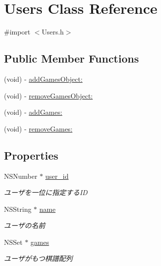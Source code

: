 \hypertarget{interface_users}{
\section{Users Class Reference}
\label{interface_users}
}


{\ttfamily \#import $<$Users.h$>$}

\subsection*{Public Member Functions}
\begin{DoxyCompactItemize}
\item 
(void) -\/ \hyperlink{interface_users_a9e60f26bc975d9867dfb48b44a9d1a27}{addGamesObject:}
\item 
(void) -\/ \hyperlink{interface_users_a7a1b1e37f674755055ce137a77b7ad21}{removeGamesObject:}
\item 
(void) -\/ \hyperlink{interface_users_a447de9f95daae7143c9decf6aa0cd159}{addGames:}
\item 
(void) -\/ \hyperlink{interface_users_aa0bacfe5f2200d9798330841018ff106}{removeGames:}
\end{DoxyCompactItemize}
\subsection*{Properties}
\begin{DoxyCompactItemize}
\item 
\hypertarget{interface_users_a2e2333f58b37f146db9e1f3dd734686e}{
NSNumber $\ast$ \hyperlink{interface_users_a2e2333f58b37f146db9e1f3dd734686e}{user\_\-id}}
\label{interface_users_a2e2333f58b37f146db9e1f3dd734686e}

\begin{DoxyCompactList}\small\item\em ユーザを一位に指定するID \end{DoxyCompactList}\item 
\hypertarget{interface_users_af92ad80b7b2ebf398881ba5d8311205d}{
NSString $\ast$ \hyperlink{interface_users_af92ad80b7b2ebf398881ba5d8311205d}{name}}
\label{interface_users_af92ad80b7b2ebf398881ba5d8311205d}

\begin{DoxyCompactList}\small\item\em ユーザの名前 \end{DoxyCompactList}\item 
\hypertarget{interface_users_a7fa20e26266b8dd9a9daca4dd67ee7b0}{
NSSet $\ast$ \hyperlink{interface_users_a7fa20e26266b8dd9a9daca4dd67ee7b0}{games}}
\label{interface_users_a7fa20e26266b8dd9a9daca4dd67ee7b0}

\begin{DoxyCompactList}\small\item\em ユーザがもつ棋譜配列 \end{DoxyCompactList}\end{DoxyCompactItemize}


